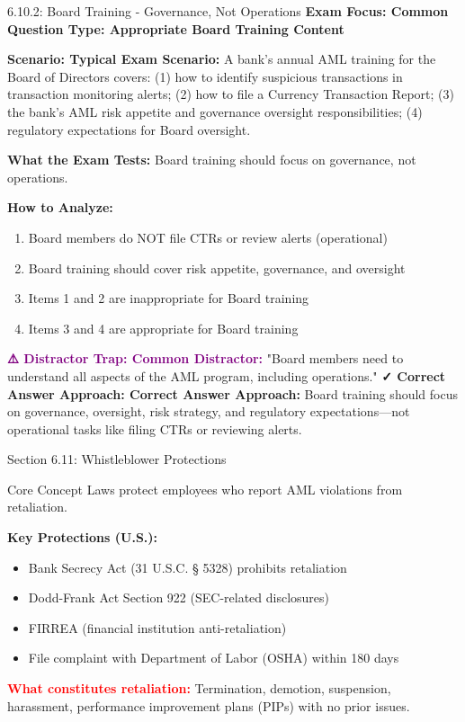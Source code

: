 \documentclass[11pt,a4paper]{beamer}
\newcommand{\redflag}[1]{\textcolor{red}{\textbf{#1}}}
\newcommand{\examfocus}[1]{\textcolor{orange!80!black}{\textbf{Exam Focus: #1}}}
\newcommand{\trap}[1]{\textcolor{purple}{\textbf{⚠️ Distractor Trap: #1}}}
\newcommand{\correct}[1]{\textcolor{green!50!black}{\textbf{✓ Correct Answer Approach: #1}}}
\newcommand{\scenario}[1]{\textcolor{blue!70!black}{\textbf{Scenario: #1}}}
\begin{document}
	\begin{frame}{6.10.2: Board Training - Governance, Not Operations}
		\examfocus{Common Question Type: Appropriate Board Training Content}
		
		\scenario{Typical Exam Scenario:}
		A bank's annual AML training for the Board of Directors covers: (1) how to identify suspicious transactions in transaction monitoring alerts; (2) how to file a Currency Transaction Report; (3) the bank's AML risk appetite and governance oversight responsibilities; (4) regulatory expectations for Board oversight.
		
		\textbf{What the Exam Tests:} Board training should focus on governance, not operations.
		
		\textbf{How to Analyze:}
		\begin{enumerate}
			\item Board members do NOT file CTRs or review alerts (operational)
			\item Board training should cover risk appetite, governance, and oversight
			\item Items 1 and 2 are inappropriate for Board training
			\item Items 3 and 4 are appropriate for Board training
		\end{enumerate}
		
		\trap{Common Distractor:} "Board members need to understand all aspects of the AML program, including operations."
		\correct{Correct Answer Approach:} Board training should focus on governance, oversight, risk strategy, and regulatory expectations—not operational tasks like filing CTRs or reviewing alerts.
	\end{frame}
	
	
	\begin{frame}{Section 6.11: Whistleblower Protections}
		\begin{block}{Core Concept}
			Laws protect employees who report AML violations from retaliation.
		\end{block}
		\textbf{Key Protections (U.S.):}
		\begin{itemize}
			\item Bank Secrecy Act (31 U.S.C. § 5328) prohibits retaliation
			\item Dodd-Frank Act Section 922 (SEC-related disclosures)
			\item FIRREA (financial institution anti-retaliation)
			\item File complaint with Department of Labor (OSHA) within 180 days
		\end{itemize}
		\redflag{What constitutes retaliation:} Termination, demotion, suspension, harassment, performance improvement plans (PIPs) with no prior issues.
	\end{frame}
	
\end{document}
